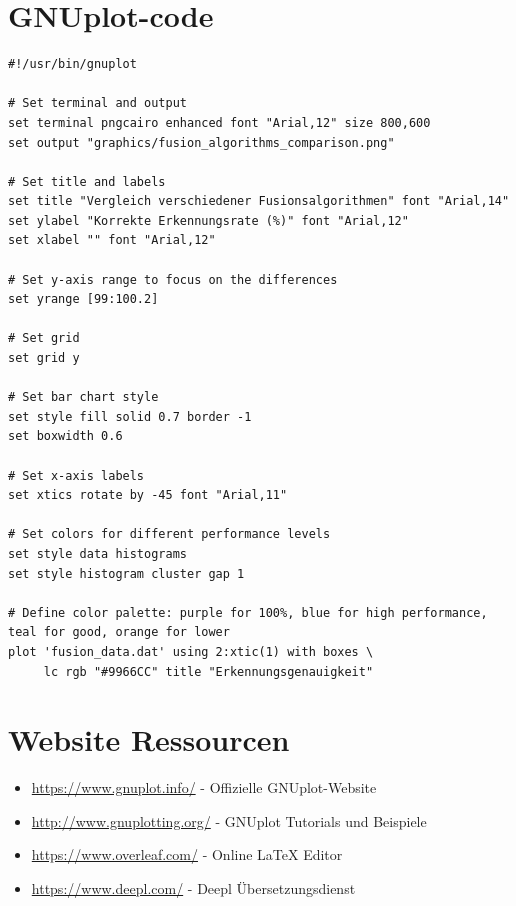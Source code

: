 \documentclass[paper=a4,fontsize=12pt,ngerman]{scrartcl}
\begin{document}
\section{GNUplot-code}
\begin{lstlisting}[caption={Gnuplot-Skript für Fusionsalgorithmen}]
#!/usr/bin/gnuplot

# Set terminal and output
set terminal pngcairo enhanced font "Arial,12" size 800,600
set output "graphics/fusion_algorithms_comparison.png"

# Set title and labels
set title "Vergleich verschiedener Fusionsalgorithmen" font "Arial,14"
set ylabel "Korrekte Erkennungsrate (%)" font "Arial,12"
set xlabel "" font "Arial,12"

# Set y-axis range to focus on the differences
set yrange [99:100.2]

# Set grid
set grid y

# Set bar chart style
set style fill solid 0.7 border -1
set boxwidth 0.6

# Set x-axis labels
set xtics rotate by -45 font "Arial,11"

# Set colors for different performance levels
set style data histograms
set style histogram cluster gap 1

# Define color palette: purple for 100%, blue for high performance, teal for good, orange for lower
plot 'fusion_data.dat' using 2:xtic(1) with boxes \
     lc rgb "#9966CC" title "Erkennungsgenauigkeit"
\end{lstlisting}


\section{Website Ressourcen}

\begin{itemize}
  \item \url{https://www.gnuplot.info/} - Offizielle GNUplot-Website
  \item \url{http://www.gnuplotting.org/} - GNUplot Tutorials und Beispiele
  \item \url{https://www.overleaf.com/} - Online LaTeX Editor
  \item \url{https://www.deepl.com/} - Deepl Übersetzungsdienst
\end{itemize}
\end{document}

